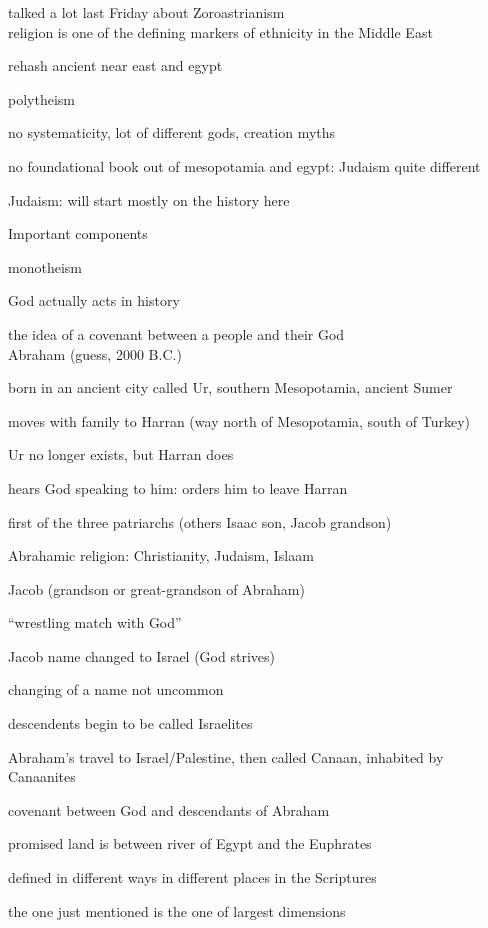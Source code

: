 \documentclass[12pt]{article}
\begin{document}
\noindent
talked a lot last Friday about Zoroastrianism\\

\noindent
religion is one of the defining markers of ethnicity in the Middle East

\noindent
rehash ancient near east and egypt

polytheism

no systematicity, lot of different gods, creation myths

no foundational book out of mesopotamia and egypt: Judaism quite different

\noindent
Judaism: will start mostly on the history here

\noindent
Important components

monotheism

God actually acts in history

the idea of a covenant between a people and their God\\

\noindent
Abraham (guess, 2000 B.C.)

born in an ancient city called Ur, southern Mesopotamia, ancient Sumer

moves with family to Harran (way north of Mesopotamia, south of Turkey)

Ur no longer exists, but Harran does

hears God speaking to him: orders him to leave Harran

first of the three patriarchs (others Isaac son, Jacob grandson)

Abrahamic religion: Christianity, Judaism, Islaam

\noindent
Jacob (grandson or great-grandson of Abraham)

``wrestling match with God''

Jacob name changed to Israel (God strives)

changing of a name not uncommon

descendents begin to be called Israelites

\noindent
Abraham's travel to Israel/Palestine, then called Canaan, inhabited by Canaanites

covenant between God and descendants of Abraham

promised land is between river of Egypt and the Euphrates

defined in different ways in different places in the Scriptures

the one just mentioned is the one of largest dimensions
\end{document}
